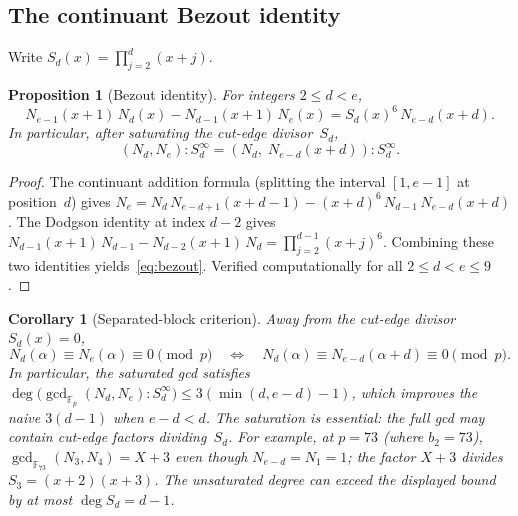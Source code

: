 \documentclass[11pt]{article}
\newtheorem{proposition}[theorem]{Proposition}
\newtheorem{corollary}[theorem]{Corollary}
\theoremstyle{definition}
\theoremstyle{remark}
\begin{document}
\subsection{The continuant Bezout identity}

Write $S_d(x) = \prod_{j=2}^{d}(x+j)$.

\begin{proposition}[Bezout identity]\label{prop:bezout}
For integers $2 \le d < e$,
\begin{equation}\label{eq:bezout}
N_{e-1}(x{+}1)\,N_d(x) - N_{d-1}(x{+}1)\,N_e(x)
= S_d(x)^6\,N_{e-d}(x+d).
\end{equation}
In particular, after saturating the cut-edge divisor~$S_d$,
\[
(N_d, N_e) : S_d^\infty
= (N_d,\; N_{e-d}(x+d)) : S_d^\infty.
\]
\end{proposition}
\begin{proof}
The continuant addition formula (splitting the
interval $[1,e{-}1]$ at position~$d$) gives
$N_e = N_d\,N_{e-d+1}(x{+}d{-}1) -
(x{+}d)^6\,N_{d-1}\,N_{e-d}(x{+}d)$.
The Dodgson identity at index $d{-}2$ gives
$N_{d-1}(x{+}1)\,N_{d-1} - N_{d-2}(x{+}1)\,N_d
= \prod_{j=2}^{d-1}(x{+}j)^6$.
Combining these two identities yields~\eqref{eq:bezout}.
Verified computationally for all $2 \le d < e \le 9$.
\end{proof}

\begin{corollary}[Separated-block criterion]\label{cor:sep-block}
Away from the cut-edge divisor $S_d(x) = 0$,
\[
N_d(\alpha) \equiv N_e(\alpha) \equiv 0 \pmod{p}
\quad\Longleftrightarrow\quad
N_d(\alpha) \equiv N_{e-d}(\alpha+d) \equiv 0 \pmod{p}.
\]
In particular, the \emph{saturated} gcd satisfies
$\deg\bigl(\gcd_{\mathbb{F}_p}(N_d, N_e) : S_d^\infty\bigr)
\le 3(\min(d, e{-}d) - 1)$, which improves the naive
$3(d{-}1)$ when $e - d < d$.
The saturation is essential: the full gcd may contain
cut-edge factors dividing~$S_d$.  For example, at
$p = 73$ (where $b_2 = 73$),
$\gcd_{\mathbb{F}_{73}}(N_3, N_4) = X + 3$
even though $N_{e-d} = N_1 = 1$;
the factor $X + 3$ divides $S_3 = (x{+}2)(x{+}3)$.
The unsaturated degree can exceed the displayed bound
by at most $\deg S_d = d - 1$.
\end{corollary}
\end{document}
